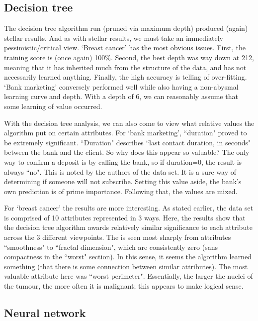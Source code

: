 \subsection{Decision tree}

The decision tree algorithm run (pruned via maximum depth) produced (again) stellar results. And as with stellar results, we must take an immediately pessimistic/critical view. `Breast cancer' has the most obvious issues. First, the training score is (once again) 100\%. Second, the best depth was way down at 212, meaning that it has inherited much from the structure of the data, and has not necessarily learned anything. Finally, the high accuracy is telling of over-fitting. `Bank marketing' conversely performed well while also having a non-abysmal learning curve and depth. With a depth of 6, we can reasonably assume that some learning of value occurred.

With the decision tree analysis, we can also come to view what relative values the algorithm put on certain attributes. For `bank marketing', ``duration" proved to be extremely significant. ``Duration" describes ``last contact duration, in seconds" between the bank and the client. So why does this appear so valuable? The only way to confirm a deposit is by calling the bank, so if duration=0, the result is always ``no". This is noted by the authors of the data set. It is a sure way of determining if someone will not subscribe. Setting this value aside, the bank's own prediction is of prime importance. Following that, the values are mixed.

For `breast cancer' the results are more interesting. As stated earlier, the data set is comprised of 10 attributes represented in 3 ways. Here, the results show that the decision tree algorithm awards relatively similar significance to each attribute across the 3 different viewpoints. The is seen most sharply from attributes ``smoothness" to ``fractal dimension", which are consistently zero (sans compactness in the ``worst" section). In this sense, it seems the algorithm learned something (that there is some connection between similar attributes). The most valuable attribute here was ``worst perimeter". Essentially, the larger the nuclei of the tumour, the more often it is malignant; this appears to make logical sense.

\subsection{Neural network}

